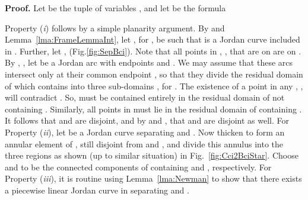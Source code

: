 \documentclass{article}
\newcommand{\qedsymbol}{\ding{113}}
\newenvironment{proof}{\par\noindent\textbf{Proof.}}{\mbox{}\hfill\qedsymbol\par\bigskip}
\begin{document}
\begin{proof}
	Let  be the tuple of variables , and let
	 be the formula
	
	
	Property ({\em i}) follows by a simple planarity argument. By
	 and Lemma~\ref{lma:FrameLemmaInt}, 
	let , for , be such that 
	 is a Jordan curve included in 
	. Further, let 
	,  
	(Fig.\ref{fig:SepBci}). Note that all points in ,
	, that are on  are on . By 
	, , let 
	 be a Jordan arc with 
	endpoints  and . 
	We may assume that these arcs intersect only at their common 
	endpoint , so that they divide the residual domain of 
	 which contains  into three sub-domains , for 
	. The existence of a point  in any 
	, , will contradict . 
	So,  must be contained entirely in the residual domain of 
	 not containing . Similarly, all points in  must 
	lie in the residual domain of  containing . It follows 
	that  and  are disjoint, and by  and 
	, that  and  are disjoint as well.
	For Property ({\em ii}), let  be a Jordan curve
	separating  and . Now thicken  to form an annular
	element of , still disjoint from  and , and divide
	this annulus into the three regions  as shown
	(up to similar situation) in Fig.~\ref{fig:Cci2BciStar}.
	Choose  and  to be the connected components
	of  containing  and , respectively.	
	For Property ({\em iii}), it is routine using Lemma~\ref{lma:Newman} 
	to show that there exists a piecewise linear Jordan curve
	  in  separating  and .
\end{proof}
\end{document}
